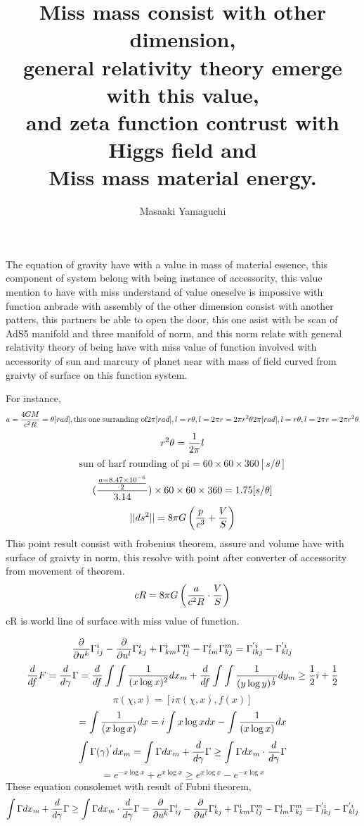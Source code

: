 \documentclass{jsarticle}
\begin{document}
\title{Miss mass consist with other dimension, \\
general relativity theory emerge with this value, \\
and zeta function contrust with Higgs field and \\
Miss mass material energy.}
\author{Masaaki Yamaguchi}
\date{}
\maketitle

  The equation of gravity have with a value in mass of material essence,
  this component of system belong with being instance of accessority,
  this value mention to have with miss understand of value oneselve is
  impossive with function anbrade with assembly of the other dimension
  consist with another patters, this partners be able to open the door,
  this one asist with be scan of AdS5 manifold and three manifold of norm,
  and this norm relate with general relativity theory of being have with
  miss value of function involved with accessority of sun and marcury of planet
  near with mass of field curved from graivty of surface on this function
  system.

  For instance,
  $$ a = {4 GM \over {c^2 R}} = \theta [rad], \text{this one surranding of} 2\pi
  [rad], l = r\theta, l = 2\pi r = 2 \pi r^2 \theta 2\pi
  [rad], l = r\theta, l = 2\pi r = 2 \pi r^2 \theta $$
  $$ r^2 \theta = {1 \over {2\pi}}l $$
  $$ \text{sun of harf rounding of pi} = 60 \times 60 \times 360 [s/\theta]$$
  $$ ({{{a = 8.47 \times 10^{-6}} \over 2} \over 3.14}) \times 60
  \times 60 \times 360  = 1.75[s/\theta]$$
  $$ ||ds^2|| = 8\pi G\left({p \over c^3} + {V \over S}\right) $$
  This point result consist with frobenius theorem, assure and volume
  have with surface of graivty in norm, this resolve with point after
  converter of accessority from movement of theorem.
  $$ cR = 8\pi G\left({a \over {c^2 R}} \cdot {V \over S}\right) $$
  cR is world line of surface with miss value of function.
 
  $$ {\partial \over {\partial u^k}}\Gamma^{i}_{ij}
  - {\partial \over {\partial u^{l}}}\Gamma^{i}_{kj}
  + \Gamma^{i}_{km}\Gamma^{m}_{lj} - \Gamma^{i}_{lm}\Gamma^{m}_{kj}
   = \Gamma^{'i}_{lkj} - \Gamma^{'i}_{klj} $$
   $$ {d \over {d f}}F = {d \over {d \gamma}}\Gamma
   = {d \over {d f}}\int\int{1 \over {(x \log x)^2}}dx_m
   + {d \over {d f}}\int\int{1 \over {(y \log y)^{1 \over 2}}}dy_m
   \ge {1 \over 2}i + {1 \over 2} $$
   $$ \pi(\chi,x) = [i\pi(\chi,x),f(x)] $$
   $$ = \int {1 \over {(x \log x)}}dx = i\int x \log x dx - \int{1 \over 
   {(x \log x)}}dx $$
   $$ \int \Gamma(\gamma)^{'}dx_m = \int \Gamma dx_m + {d \over 
   {d \gamma}}\Gamma \ge \int \Gamma dx_m \cdot {d \over {d \gamma}}\Gamma $$
   $$ = e^{-x \log x} + e^{x \log x} \ge e^{x \log x} - e^{-x \log x} $$
   These equation consolemet with result of Fubni theorem,
   $$  \int \Gamma dx_m + {d \over 
   {d \gamma}}\Gamma \ge \int \Gamma dx_m \cdot {d \over {d \gamma}}\Gamma
   =  {\partial \over {\partial u^k}}\Gamma^{i}_{ij}
  - {\partial \over {\partial u^{l}}}\Gamma^{i}_{kj}
  + \Gamma^{i}_{km}\Gamma^{m}_{lj} - \Gamma^{i}_{lm}\Gamma^{m}_{kj}
   = \Gamma^{'i}_{lkj} - \Gamma^{'i}_{klj} $$
\end{document}
